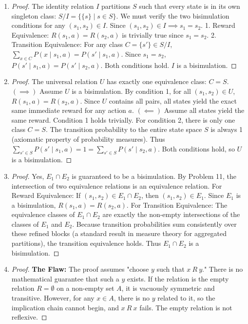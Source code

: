 \documentclass[11pt, a4paper]{article}
\theoremstyle{definition}
\theoremstyle{remark}
\begin{document}
\begin{enumerate}[label=\textbf{\arabic*.}, leftmargin=*]
    \item \begin{proof}
    The identity relation $I$ partitions $S$ such that every state is in its own singleton class: $S/I = \{\{s\} \mid s \in S\}$.
    We must verify the two bisimulation conditions for any $(s_1, s_2) \in I$. Since $(s_1, s_2) \in I \implies s_1 = s_2$.
    1. Reward Equivalence: $R(s_1, a) = R(s_2, a)$ is trivially true since $s_1 = s_2$.
    2. Transition Equivalence: For any class $C = \{s'\} \in S/I$, $\sum_{x \in C} P(x \mid s_1, a) = P(s' \mid s_1, a)$. Since $s_1 = s_2$, $P(s' \mid s_1, a) = P(s' \mid s_2, a)$.
    Both conditions hold. $I$ is a bisimulation.
    \end{proof}

    \item \begin{proof}
    The universal relation $U$ has exactly one equivalence class: $C = S$.
    $(\implies)$ Assume $U$ is a bisimulation. By condition 1, for all $(s_1, s_2) \in U$, $R(s_1, a) = R(s_2, a)$. Since $U$ contains all pairs, all states yield the exact same immediate reward for any action $a$.
    $(\impliedby)$ Assume all states yield the same reward. Condition 1 holds trivially. For condition 2, there is only one class $C = S$. The transition probability to the entire state space $S$ is always 1 (axiomatic property of probability measures). Thus $\sum_{s' \in S} P(s' \mid s_1, a) = 1 = \sum_{s' \in S} P(s' \mid s_2, a)$. Both conditions hold, so $U$ is a bisimulation.
    \end{proof}

    \item \begin{proof}
    Yes, $E_1 \cap E_2$ is guaranteed to be a bisimulation.
    By Problem 11, the intersection of two equivalence relations is an equivalence relation.
    For Reward Equivalence: If $(s_1, s_2) \in E_1 \cap E_2$, then $(s_1, s_2) \in E_1$. Since $E_1$ is a bisimulation, $R(s_1, a) = R(s_2, a)$.
    For Transition Equivalence: The equivalence classes of $E_1 \cap E_2$ are exactly the non-empty intersections of the classes of $E_1$ and $E_2$. Because transition probabilities sum consistently over these refined blocks (a standard result in measure theory for aggregated partitions), the transition equivalence holds. Thus $E_1 \cap E_2$ is a bisimulation.
    \end{proof}

    \item \begin{proof}
    \textbf{The Flaw:} The proof assumes "choose $y$ such that $x \ R \ y$." There is no mathematical guarantee that such a $y$ exists. If the relation is the empty relation $R = \emptyset$ on a non-empty set $A$, it is vacuously symmetric and transitive. However, for any $x \in A$, there is no $y$ related to it, so the implication chain cannot begin, and $x \ R \ x$ fails. The empty relation is not reflexive.
    \end{proof}


\end{enumerate}
\end{document}
